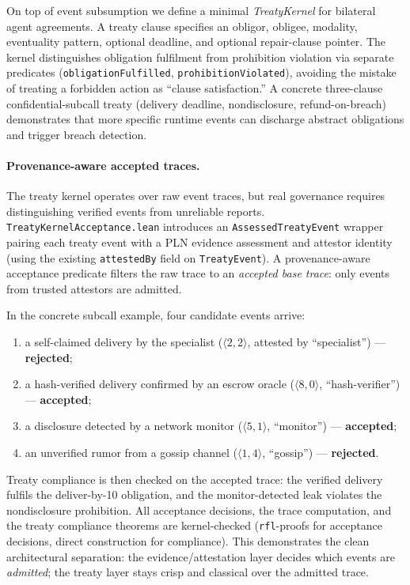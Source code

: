 \documentclass[]{article}
\newcommand{\code}[1]{\texttt{#1}}
\newcommand{\PLN}{\textup{PLN}}
\begin{document}
On top of event subsumption we define a minimal \emph{TreatyKernel} for
bilateral agent agreements.  A treaty clause specifies an obligor, obligee,
modality, eventuality pattern, optional deadline, and optional repair-clause
pointer.  The kernel distinguishes obligation fulfilment from prohibition
violation via separate predicates (\code{obligationFulfilled},
\code{prohibitionViolated}), avoiding the mistake of treating a forbidden
action as ``clause satisfaction.''  A concrete three-clause
confidential-subcall treaty (delivery deadline, nondisclosure,
refund-on-breach) demonstrates that more specific runtime events can discharge
abstract obligations and trigger breach detection.

\paragraph{Provenance-aware accepted traces.}
The treaty kernel operates over raw event traces, but real governance
requires distinguishing verified events from unreliable reports.
\code{TreatyKernelAcceptance.lean} introduces an
\code{AssessedTreatyEvent} wrapper pairing each treaty event with a
\PLN{} evidence assessment and attestor identity (using the existing
\code{attestedBy} field on \code{TreatyEvent}).  A provenance-aware
acceptance predicate filters the raw trace to an \emph{accepted base
trace}: only events from trusted attestors are admitted.

In the concrete subcall example, four candidate events arrive:
\begin{enumerate}
\item a self-claimed delivery by the specialist ($\langle 2,2\rangle$,
      attested by ``specialist'') --- \textbf{rejected};
\item a hash-verified delivery confirmed by an escrow oracle
      ($\langle 8,0\rangle$, ``hash-verifier'') --- \textbf{accepted};
\item a disclosure detected by a network monitor
      ($\langle 5,1\rangle$, ``monitor'') --- \textbf{accepted};
\item an unverified rumor from a gossip channel
      ($\langle 1,4\rangle$, ``gossip'') --- \textbf{rejected}.
\end{enumerate}

\noindent
Treaty compliance is then checked on the accepted trace:
the verified delivery fulfils the deliver-by-10 obligation, and the
monitor-detected leak violates the nondisclosure prohibition.
All acceptance decisions, the trace computation, and the treaty
compliance theorems are kernel-checked (\code{rfl}-proofs for
acceptance decisions, direct construction for compliance).  This
demonstrates the clean architectural separation: the evidence/attestation
layer decides which events are \emph{admitted}; the treaty layer
stays crisp and classical over the admitted trace.
\end{document}
